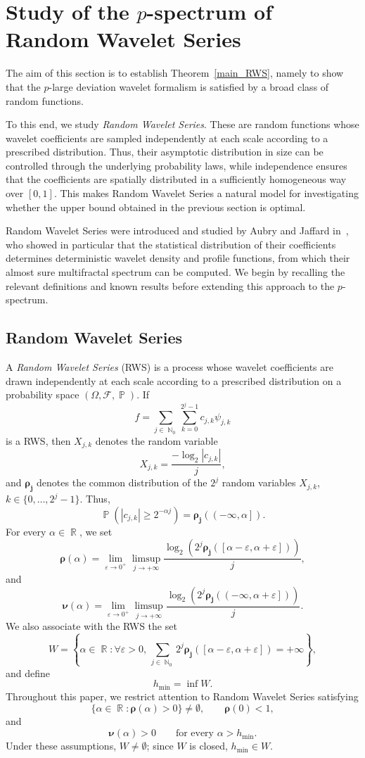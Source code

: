 \documentclass[a4paper,11pt,oneside]{article}
\DeclareMathOperator{\R}{\mathbb{R}}
\DeclareMathOperator{\N}{\mathbb{N}}
\DeclareMathOperator{\prob}{\mathbb{P}}
\newcommand{\ccint}[1]{\left[{#1}\right]}
\newcommand{\ocint}[1]{\left({#1}\right]}
\theoremstyle{definition}
\theoremstyle{plain}
\begin{document}
\section{Study of the $p$-spectrum of Random Wavelet Series}\label{secRWStot}

The aim of this section is to establish Theorem~\ref{main_RWS}, namely to show that the $p$-large deviation wavelet formalism is satisfied by a broad class of random functions.

To this end, we study \textit{Random Wavelet Series}. These are random functions whose wavelet coefficients are sampled independently at each scale according to a prescribed distribution. Thus, their asymptotic distribution in size can be controlled through the underlying probability laws, while independence ensures that the coefficients are spatially distributed in a sufficiently homogeneous way over $[0,1]$. This makes Random Wavelet Series a natural model for investigating whether the upper bound obtained in the previous section is optimal.


Random Wavelet Series were introduced and studied by Aubry and Jaffard in~\cite{RWS}, who showed in particular that the statistical distribution of their coefficients determines deterministic wavelet density and profile functions, from which their almost sure multifractal spectrum can be computed. We begin by recalling the relevant definitions and known results before extending this approach to the $p$-spectrum.


\subsection{Random Wavelet Series}\label{secRWS}

A \textit{Random Wavelet Series} (RWS) is a process whose wavelet coefficients are drawn independently at each scale according to a prescribed distribution on a probability space $(\Omega,\mathscr{F},\prob)$. If
\[
f=\sum_{j\in\N_0}\sum_{k=0}^{2^j-1}c_{j,k}\psi_{j,k}
\]
is a RWS, then $X_{j,k}$ denotes the random variable
\[
X_{j,k}=\frac{-\log_2|c_{j,k}|}{j},
\]
and $\bm{\rho_j}$ denotes the common distribution of the $2^j$ random variables
$X_{j,k}$, $k\in\{0,\ldots,2^j-1\}$. Thus,
\[
\prob\left(|c_{j,k}|\geq 2^{-\alpha j}\right)
=
\bm{\rho_j}(\ocint{-\infty,\alpha}).
\]
For every $\alpha\in\R$, we set
\[
\bm{\rho}(\alpha)=
\lim_{\varepsilon\rightarrow0^+}
\limsup_{j\rightarrow+\infty}
\frac{
\log_2\left(
2^j\bm{\rho_j}(\ccint{\alpha-\varepsilon,\alpha+\varepsilon})
\right)
}{j},
\]
and
\[
\bm{\nu}(\alpha)=
\lim_{\varepsilon\rightarrow0^+}
\limsup_{j\rightarrow+\infty}
\frac{
\log_2\left(
2^j\bm{\rho_j}(\ocint{-\infty,\alpha+\varepsilon})
\right)
}{j}.
\]
We also associate with the RWS the set
\[
W=
\left\{
\alpha\in\R:
\forall\varepsilon>0,\,
\sum_{j\in\N_0}
2^j\bm{\rho_j}
(\ccint{\alpha-\varepsilon,\alpha+\varepsilon})
=+\infty
\right\},
\]
and define
\[
h_{\min}=\inf W.
\]
Throughout this paper, we restrict attention to Random Wavelet Series satisfying
\[
\{\alpha\in\R:\bm{\rho}(\alpha)>0\}\neq\emptyset,
\qquad
\bm{\rho}(0)<1,
\]
and
\[
\bm{\nu}(\alpha)>0
\qquad\text{for every }\alpha>h_{\min}.
\]
Under these assumptions, $W\neq\emptyset$; since $W$ is closed,
$h_{\min}\in W$.
\end{document}
